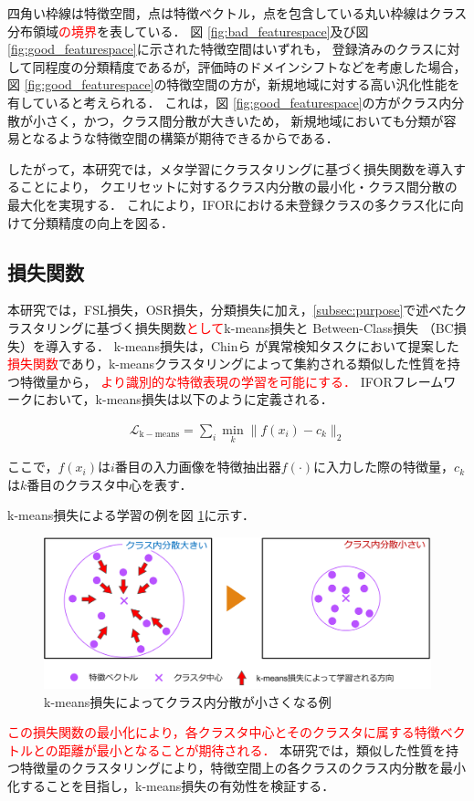 \documentclass[a4paper,11pt,nomag]{jsreport}
\begin{document}
% 
四角い枠線は特徴空間，点は特徴ベクトル，点を包含している丸い枠線はクラス分布領域\textcolor{red}{の境界}を表している．
図 \ref{fig:bad_featurespace}及び図 \ref{fig:good_featurespace}に示された特徴空間はいずれも，
登録済みのクラスに対して同程度の分類精度であるが，評価時のドメインシフトなどを考慮した場合，
図 \ref{fig:good_featurespace}の特徴空間の方が，新規地域に対する高い汎化性能を有していると考えられる．
これは，図 \ref{fig:good_featurespace}の方がクラス内分散が小さく，かつ，クラス間分散が大きいため，
新規地域においても分類が容易となるような特徴空間の構築が期待できるからである．

したがって，本研究では，メタ学習にクラスタリングに基づく損失関数を導入することにより，
クエリセットに対するクラス内分散の最小化・クラス間分散の最大化を実現する．
これにより，IFORにおける未登録クラスの多クラス化に向けて分類精度の向上を図る．

\subsection{損失関数}

本研究では，FSL損失，OSR損失，分類損失に加え，\ref{subsec:purpose}で述べたクラスタリングに基づく損失関数\textcolor{red}{として}k-means損失と Between-Class損失 （BC損失）を導入する．
k-means損失は，Chinら \cite{k-means}が異常検知タスクにおいて提案した\textcolor{red}{損失関数}であり，k-meansクラスタリングによって集約される類似した性質を持つ特徴量から，
\textcolor{red}{より識別的な特徴表現の学習を可能にする．}
IFORフレームワークにおいて，k-means損失は以下のように定義される．

\begin{align}
\mathcal{L}_{\mathrm{k-means}} = \sum_i{\min_k \lVert f(x_i)-c_k \rVert_2}
\end{align}

\noindent
ここで，$f(x_i)$は$i$番目の入力画像を特徴抽出器$f(\cdot)$に入力した際の特徴量，$c_k$は$k$番目のクラスタ中心を表す．

k-means損失による学習の例を図 \ref{fig:kmeans_loss}に示す．
% 
\begin{figure}[tbp]
  \centering
  \includegraphics[width=\linewidth, keepaspectratio]{image/kmeans_loss.png}
  \caption{k-means損失によってクラス内分散が小さくなる例}
  \label{fig:kmeans_loss}
\end{figure}
% 
\textcolor{red}{この損失関数の最小化により，各クラスタ中心とそのクラスタに属する特徴ベクトルとの距離が最小となることが期待される．}
本研究では，類似した性質を持つ特徴量のクラスタリングにより，特徴空間上の各クラスのクラス内分散を最小化することを目指し，k-means損失の有効性を検証する．
\end{document}
